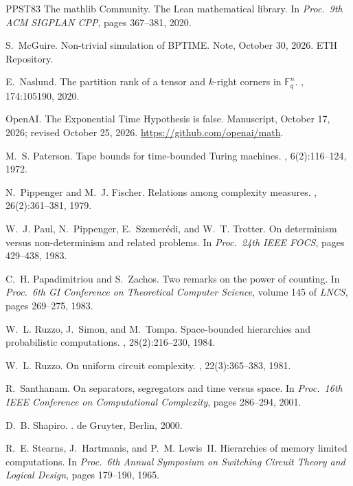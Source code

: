 \documentclass[11pt]{article}
\theoremstyle{definition}
\theoremstyle{definition}
\theoremstyle{remark}
\begin{document}
\begin{thebibliography}{PPST83}
The mathlib Community.
\newblock The {L}ean mathematical library.
\newblock In {\em Proc.\ 9th ACM SIGPLAN CPP}, pages 367--381, 2020.

S.~McGuire.
\newblock Non-trivial simulation of {BPTIME}.
\newblock Note, October 30, 2026. ETH Repository.

E.~Naslund.
\newblock The partition rank of a tensor and $k$-right corners in $\mathbb F_q^n$.
, 174:105190, 2020.

OpenAI.
\newblock The {E}xponential {T}ime {H}ypothesis is false.
\newblock Manuscript, October 17, 2026; revised October 25, 2026. \url{https://github.com/openai/math}.

M.~S. Paterson.
\newblock Tape bounds for time-bounded {T}uring machines.
, 6(2):116--124, 1972.

N.~Pippenger and M.~J. Fischer.
\newblock Relations among complexity measures.
, 26(2):361--381, 1979.

W.~J. Paul, N.~Pippenger, E.~Szemer{\'e}di, and W.~T. Trotter.
\newblock On determinism versus non-determinism and related problems.
\newblock In {\em Proc.\ 24th IEEE FOCS}, pages 429--438, 1983.

C.~H. Papadimitriou and S.~Zachos.
\newblock Two remarks on the power of counting.
\newblock In {\em Proc.\ 6th GI Conference on Theoretical Computer Science}, volume 145 of {\em LNCS}, pages 269--275, 1983.

W.~L. Ruzzo, J.~Simon, and M.~Tompa.
\newblock Space-bounded hierarchies and probabilistic computations.
, 28(2):216--230, 1984.

W.~L. Ruzzo.
\newblock On uniform circuit complexity.
, 22(3):365--383, 1981.

R.~Santhanam.
\newblock On separators, segregators and time versus space.
\newblock In {\em Proc.\ 16th IEEE Conference on Computational Complexity}, pages 286--294, 2001.

D.~B. Shapiro.
.
\newblock de Gruyter, Berlin, 2000.

R.~E. Stearns, J.~Hartmanis, and P.~M. Lewis~II.
\newblock Hierarchies of memory limited computations.
\newblock In {\em Proc.\ 6th Annual Symposium on Switching Circuit Theory and Logical Design}, pages 179--190, 1965.


\end{thebibliography}
\end{document}
